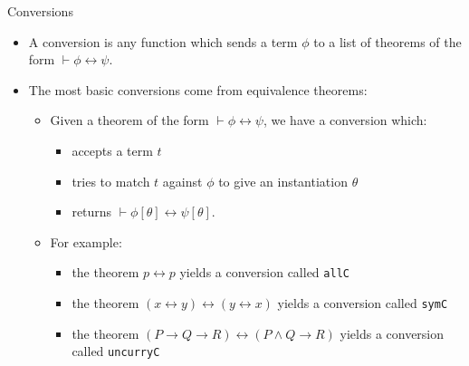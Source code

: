 \documentclass[presentation]{beamer}
\begin{document}
\begin{frame}[fragile,label={sec:orgheadline25}]{Conversions}
 \begin{itemize}
\item A conversion is any function which sends a term \(\phi\) to a list of theorems of the
form \(\vdash \phi \leftrightarrow \psi\).

\item The most basic conversions come from equivalence theorems:
\begin{itemize}
\item Given a theorem of the form \(\vdash \phi \leftrightarrow \psi\), we have a
conversion which:
\begin{itemize}
\item accepts a term \(t\)
\item tries to match \(t\) against \(\phi\) to give an instantiation \(\theta\)
\item returns \(\vdash \phi[\theta] \leftrightarrow \psi[\theta]\).
\end{itemize}
\item For example:
\begin{itemize}
\item the theorem \(p \leftrightarrow p\) yields a conversion called \texttt{allC}
\item the theorem \((x \leftrightarrow y) \leftrightarrow (y \leftrightarrow x)\)
      yields a conversion called \texttt{symC}
\item the theorem \((P \rightarrow Q \rightarrow R) \leftrightarrow (P \wedge Q
      \rightarrow R)\) yields a conversion called \texttt{uncurryC}
\end{itemize}
\end{itemize}
\end{itemize}
\end{frame}
\end{document}
